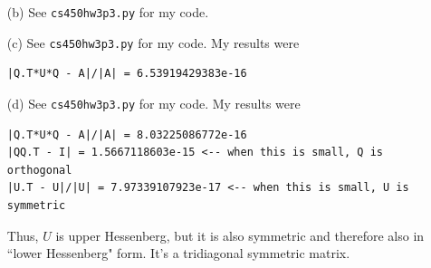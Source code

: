 \documentclass[10pt]{article}
\begin{document}
\begin{enumerate}
\item[(b)] See \verb+cs450hw3p3.py+ for my code.

\item[(c)] See \verb+cs450hw3p3.py+ for my code. My results were \begin{verbatim}
|Q.T*U*Q - A|/|A| = 6.53919429383e-16
\end{verbatim}

\item[(d)] See \verb+cs450hw3p3.py+ for my code. My results were \begin{verbatim}
|Q.T*U*Q - A|/|A| = 8.03225086772e-16
|QQ.T - I| = 1.5667118603e-15 <-- when this is small, Q is orthogonal
|U.T - U|/|U| = 7.97339107923e-17 <-- when this is small, U is symmetric
\end{verbatim}

Thus, $ U $ is upper Hessenberg, but it is also symmetric and therefore also in ``lower Hessenberg" form. It's a tridiagonal symmetric matrix.

\end{enumerate}

\end{document}
